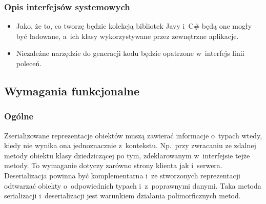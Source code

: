 \subsubsection{Opis interfejsów systemowych}
\begin{itemize}
	\item Jako, że to, co tworzę będzie kolekcją bibliotek Javy i~C\# będą one mogły być ładowane, a~ich klasy wykorzystywane przez zewnętrzne aplikacje.
	\item Niezależne narzędzie do generacji kodu będzie opatrzone w~interfejs linii poleceń.
\end{itemize}


\subsection{Wymagania funkcjonalne}

\subsubsection{Ogólne}

\begin{description}
Zserializowane reprezentacje obiektów muszą zawierać informacje o~typach wtedy, kiedy nie wynika ona jednoznacznie z~kontekstu.
Np.\ przy zwracaniu ze zdalnej metody obiektu klasy dziedziczącej po tym, zdeklarowanym w~interfejsie tejże metody.
To wymaganie dotyczy zarówno strony klienta jak i~serwera.
Deserializacja powinna być komplementarna i~ze stworzonych reprezentacji odtwarzać obiekty o~odpowiednich typach i~z~poprawnymi danymi.
Taka metoda serializacji i~deserializacji jest warunkiem działania polimorficznych metod.

\end{description}


